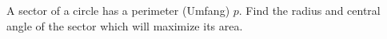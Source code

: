 \begin{exercise}
	A sector of a circle has a perimeter (Umfang) $p$.
	Find the radius and central angle of the sector
	which will maximize its area.
\end{exercise}

